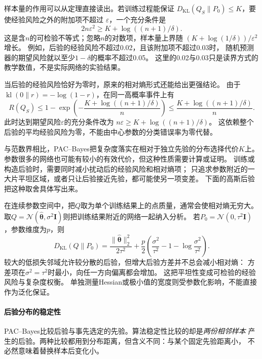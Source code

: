 样本量的作用可以从定理直接读出。若训练过程能保证
$D_{\mathrm{KL}}(Q_S\|P_0)\leq K$，要使经验风险之外的附加项不超过
$\varepsilon$，一个充分条件是
\begin{equation}
 2n\varepsilon^2\geq K+\log((n+1)/\delta).
 \label{eq:pac-bayes-sample-requirement}
\end{equation}
这是含$n$的可检验不等式；忽略$n$的对数项，样本量上界随
$(K+\log(1/\delta))/\varepsilon^2$增长。
例如，后验的经验风险不超过0.02，且该附加项不超过0.03时，
随机预测器的期望风险就以至少$1-\delta$的概率不超过0.05。
这里的0.02与0.03只是读界方式的教学数值，不是实际网络的实验结果。

当后验的经验风险恰好为零时，原来的相对熵形式还能给出更强结论。
由于$\operatorname{kl}(0\|r)=-\log(1-r)$，在同一高概率事件上有
\[
 R(Q_S)\leq1-\exp\left(-\frac{K+\log((n+1)/\delta)}n\right)
 \leq\frac{K+\log((n+1)/\delta)}n.
\]
此时达到期望风险$\varepsilon$的充分条件改为
$n\varepsilon\geq K+\log((n+1)/\delta)$。
这依赖整个后验的平均经验风险为零，不能由中心参数的分类错误率为零代替。

与范数界相比，PAC--Bayes把复杂度落实在相对于独立先验的分布选择代价$K$上。
参数很多的网络也可能有较小的有效代价，但这种性质需要计算或证明。
训练或构造后验时，需要同时减小扰动后的经验风险和相对熵项；
只追求参数附近的一大片平坦区域，或者只让后验接近先验，都可能使另一项变差。
下面的高斯后验把这种取舍具体写出来。

在连续参数空间中，把$Q$取为单个训练结果上的点质量，通常会使相对熵无穷大。
取$Q=\mathcal N(\hat{\bm\theta},\sigma^2\bm I)$则把训练结果附近的网络一起纳入分析。
若$P_0=\mathcal N(0,\tau^2\bm I)$，参数维度为$p$，则
\begin{equation}
 D_{\mathrm{KL}}(Q\|P_0)=\frac{\|\hat{\bm\theta}\|_2^2}{2\tau^2}
 +\frac p2\left(\frac{\sigma^2}{\tau^2}-1-\log\frac{\sigma^2}{\tau^2}\right).
 \label{eq:gaussian-pac-bayes-kl}
\end{equation}
较大的低损失邻域允许较分散的后验，但增大后验方差并不总会减小相对熵：
方差项在$\sigma^2=\tau^2$时最小，向任一方向偏离都会增加。
这把平坦性变成可检验的经验风险与复杂度权衡。
单独测量Hessian或极小值的宽度则受参数化影响，不能直接作为泛化保证。

\paragraph{后验分布的稳定性}

PAC--Bayes比较后验与事先选定的先验。算法稳定性比较的却是\emph{两份相邻样本}
产生的后验。两种比较都用到分布距离，但含义不同：与某个固定先验距离小，
不必然意味着替换样本后变化小。

